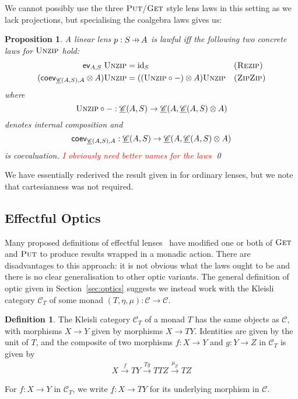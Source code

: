 \documentclass[11pt,letterpaper]{article}
\theoremstyle{plain}
\newtheorem{proposition}[theorem]{Proposition}
\theoremstyle{definition}
\newtheorem{definition}[theorem]{Definition}
\newcommand{\C}{\mathscr{C}}
\newcommand{\homC}{\underline{\C}}
\newcommand{\id}{\mathrm{id}}
\newcommand{\fget}{\textsc{Get}}
\newcommand{\fput}{\textsc{Put}}
\newcommand{\funzip}{\textsc{Unzip}}
\newcommand{\hto}{\ensuremath{\,\mathaccent\shortmid\rightarrow\,}}
\newcommand{\todo}[1]{\textcolor{red}{\small #1}}
\begin{document}
We cannot possibly use the three $\fput$/$\fget$ style lens laws in this setting as we lack projections, but specialising the coalgebra laws gives us:

\begin{proposition}\label{prop:concrete-linear-lawful}
  A linear lens $p : S \hto A$ is lawful iff the following two concrete laws for $\funzip$ hold:
  \begin{align*}
    \ev_{A, S} \; \funzip &= \id_S && \textsc{(Rezip)} \\
    (\coev_{\homC(A, S), A} \otimes A)\funzip &= ((\funzip \circ -) \otimes A)\funzip && \textsc{(ZipZip)}
  \end{align*}
  where \[ \funzip \circ - : \homC(A, S) \to \homC(A, \homC(A, S) \otimes A) \] denotes internal composition and \[\coev_{\homC(A, S), A} : \homC(A, S) \to \homC(A, \homC(A, S) \otimes A)\] is coevaluation.
  \todo{I obviously need better names for the laws} \qed
\end{proposition}

We have essentially rederived the result given in \cite[Section 3.2]{RelatingAlgebraicAndCoalgebraic} for ordinary lenses, but we note that cartesianness was not required.

\subsection{Effectful Optics}
\newcommand{\monact}{\rtimes}

Many proposed definitions of effectful lenses~\cite{ReflectionsOnMonadicLenses} have modified one or both of $\fget$ and $\fput$ to produce results wrapped in a monadic action. There are disadvantages to this approach: it is not obvious what the laws ought to be and there is no clear generalisation to other optic variants. The general definition of optic given in Section~\ref{sec:optics} suggests we instead work with the Kleisli category $\C_T$ of some monad $(T, \eta, \mu) : \C \to \C$.

\begin{definition}
The Kleisli category $\C_T$ of a monad $T$ has the same objects as $\C$, with morphisms $X \to Y$ given by morphisms $X \to TY$. Identities are given by the unit of $T$, and the composite of two morphisms $f : X \to Y$ and $g : Y \to Z$ in $\C_T$ is given by
\begin{align*}
X \xrightarrow{f} TY \xrightarrow{Tg} TTZ \xrightarrow{\mu_Z} TZ
\end{align*}

For $f : X \to Y$ in $\C_T$, we write $\underline{f} : X \to TY$ for its underlying morphism in $\C$.
\end{definition}
\end{document}
